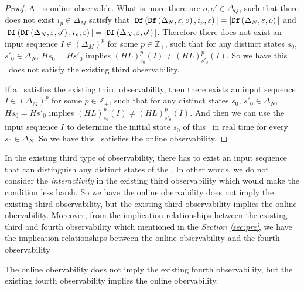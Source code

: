 \begin{proof}
A \BCN\ is online observable. What is more there are $o,o'\in\Delta_Q$, such that there does not exist $i_p \in \Delta_M$ satisfy that $|{\tt Df}\left({\tt Df}\left(\Delta_N,\varepsilon, o\right),i_p,\varepsilon\right)|=|{\tt Df}\left(\Delta_N,\varepsilon, o\right)|$ and $|{\tt Df}\left({\tt Df}\left(\Delta_N,\varepsilon, o'\right),i_p,\varepsilon\right)|=|{\tt Df}\left(\Delta_N,\varepsilon, o'\right)|$. Therefore there does not exist an input sequence $I\in(\Delta_M)^p$ for some $p\in \mathbb{Z}_+$, such that for any distinct states $s_0$, ${s'}_0 \in \Delta_N$, $Hs_0=H{s'}_0$ implies $(HL)^p_{s_0}(I)\neq (HL)^p_{{s'}_0}(I)$. So we have this \BCN\ does not satisfy the existing third observability.

If a \BCN\ satisfies the existing third observability, then there exists an input sequence $I\in(\Delta_M)^p$ for some $p\in \mathbb{Z}_+$, such that for any distinct states $s_0$, ${s'}_0 \in \Delta_N$, $Hs_0=H{s'}_0$ implies $(HL)^p_{s_0}(I)\neq (HL)^p_{{s'}_0}(I)$. And then we can use the input sequence $I$ to determine the initial state $s_0$ of this \BCN\ in real time for every $s_0\in \Delta_N$. So we have this \BCN\ satisfies the online observability.
\end{proof}

In the existing third type of observability, there has to exist an input sequence that can distinguish any distinct states of the \BCN. In other words, we do not consider the {\em interactivity} in the existing third observability which would make the condition less harsh. So we have the online obervability does not imply the existing third observability, but the existing third observability implies the online obervability. Moreover, from the implication relationships between the existing third and fourth observability which mentioned in the {\em Section \ref{sec:pre}}, we have the implication relationships between the online observability and the fourth observability
\begin{theorem}
The online obervability does not imply the existing fourth observability, but the existing fourth observability implies the online obervability.
\label{theo:5}
\end{theorem}

